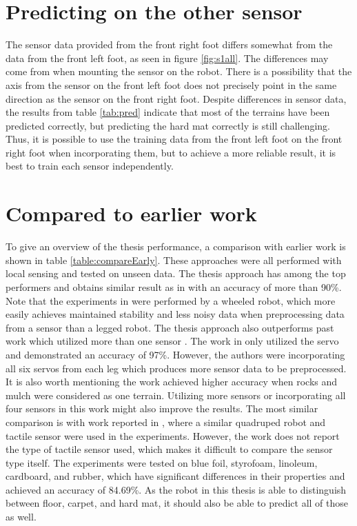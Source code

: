 \documentclass[USenglish]{ifimaster}  %
\begin{document}
\section{Predicting on the other sensor}
The sensor data provided from the front right foot differs somewhat from the data from the front left foot, as seen in figure \ref{fig:s1all}. The differences may come from when mounting the sensor on the robot. There is a possibility that the axis from the sensor on the front left foot does not precisely point in the same direction as the sensor on the front right foot. Despite differences in sensor data, the results from table \ref{tab:pred} indicate that most of the terrains have been predicted correctly, but predicting the hard mat correctly is still challenging.  Thus, it is possible to use the training data from the front left foot on the front right foot when incorporating them, but to achieve a more reliable result, it is best to train each sensor independently.


\section{Compared to earlier work}
To give an overview of the thesis performance, a comparison with earlier work is shown in table \ref{table:compareEarly}. These approaches were all performed with local sensing and tested on unseen data. The thesis approach has among the top performers and obtains similar result as in \cite{5752869,4059113,5602459,26b23e912c654fe4b7478fd910130195} with an accuracy of more than 90\%. Note that the experiments in \cite{5752869,4059113} were performed by a wheeled robot, which more easily achieves maintained stability and less noisy data when preprocessing data from a sensor than a legged robot. The thesis approach also outperforms past work which utilized more than one sensor \cite{6849778,6386243}. The work in \cite{26b23e912c654fe4b7478fd910130195} only utilized the servo and demonstrated an accuracy of 97\%.  However, the authors were incorporating all six servos from each leg which produces more sensor data to be preprocessed. It is also worth mentioning the work achieved higher accuracy when rocks and mulch were considered as one terrain. Utilizing more sensors or incorporating all four sensors in this work might also improve the results. The most similar comparison is with work reported in \cite{6784609}, where a similar quadruped robot and tactile sensor were used in the experiments. However, the work does not report the type of tactile sensor used, which makes it difficult to compare the sensor type itself. The experiments were tested on blue foil, styrofoam, linoleum, cardboard, and rubber, which have significant differences in their properties and achieved an accuracy of 84.69\%. As the robot in this thesis is able to distinguish between floor, carpet, and hard mat, it should also be able to predict all of those as well.
\end{document}
